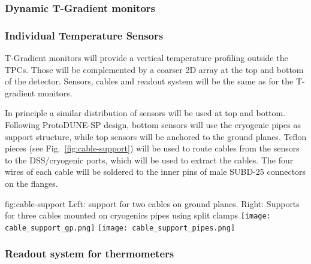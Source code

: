 \subsubsection{Dynamic T-Gradient monitors}


\subsubsection{Individual Temperature Sensors}

T-Gradient monitors will provide a vertical temperature profiling outside the TPCs. Those will be complemented by a coarser 2D array at the top and bottom of the
detector. Sensors, cables and readout system will be the same as for the T-gradient monitors. 

In principle a similar distribution of sensors will be used at top and bottom.
Following ProtoDUNE-SP design, bottom sensors will use the cryogenic pipes as support structure, while top sensors will be anchored to the ground planes.
Teflon pieces (see Fig.~\ref{fig:cable-support}) will be used to route cables from the sensors to the DSS/cryogenic ports, which will be used to extract the cables.
The four wires of each cable will be soldered to the inner pins of male SUBD-25 connectors on the flanges. 

\begin{dunefigure}{fig:cable-support}
  {Left: support for two cables on ground planes. Right: Supports for three cables  mounted on cryogenics pipes using split clamps}
  \texttt{[image: cable\_support\_gp.png]}
  \texttt{[image: cable\_support\_pipes.png]}
\end{dunefigure}


\subsubsection{Readout system for thermometers}
\label{sec:fdsp-slow-cryo-therm-readout}

